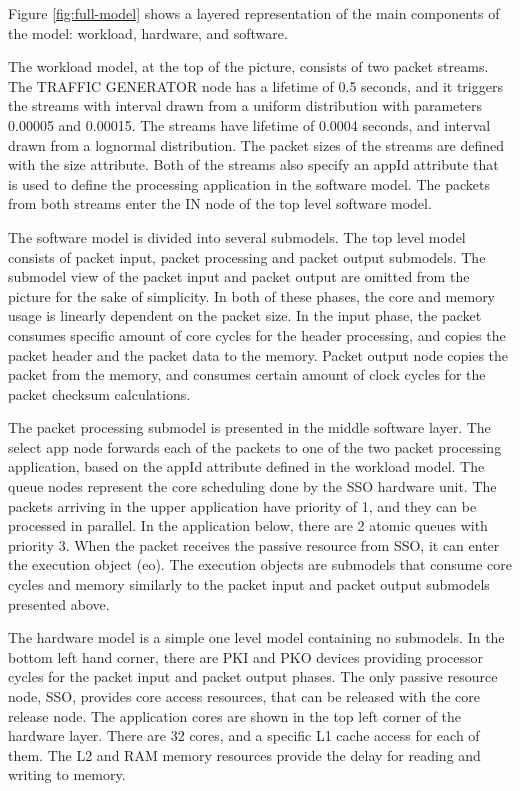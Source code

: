 Figure \ref{fig:full-model} shows a layered representation of the main components of the model: workload, hardware, and software.

The workload model, at the top of the picture, consists of two packet streams. The TRAFFIC GENERATOR node has a lifetime of 0.5 seconds, and it triggers the streams with interval drawn from a uniform distribution with parameters 0.00005 and 0.00015. The streams have lifetime of 0.0004 seconds, and interval drawn from a lognormal distribution. The packet sizes of the streams are defined with the size attribute. Both of the streams also specify an appId attribute that is used to define the processing application in the software model. The packets from both streams enter the IN node of the top level software model.

The software model is divided into several submodels. The top level model consists of packet input, packet processing and packet output submodels. The submodel view of the packet input and packet output are omitted from the picture for the sake of simplicity. In both of these phases, the core and memory usage is linearly dependent on the packet size. In the input phase, the packet consumes specific amount of core cycles for the header processing, and copies the packet header and the packet data to the memory. Packet output node copies the packet from the memory, and consumes certain amount of clock cycles for the packet checksum calculations.

The packet processing submodel is presented in the middle software layer. The select app node forwards each of the packets to one of the two packet processing application, based on the appId attribute defined in the workload model. The queue nodes represent the core scheduling done by the SSO hardware unit. The packets arriving in the upper application have priority of 1, and they can be processed in parallel. In the application below, there are 2 atomic queues with priority 3. When the packet receives the passive resource from SSO, it can enter the execution object (eo). The execution objects are submodels that consume core cycles and memory similarly to the packet input and packet output submodels presented above.

The hardware model is a simple one level model containing no submodels. In the bottom left hand corner, there are PKI and PKO devices providing processor cycles for the packet input and packet output phases. The only passive resource node, SSO, provides core access resources, that can be released with the core release node. The application cores are shown in the top left corner of the hardware layer. There are 32 cores, and a specific L1 cache access for each of them. The L2 and RAM memory resources provide the delay for reading and writing to memory.

